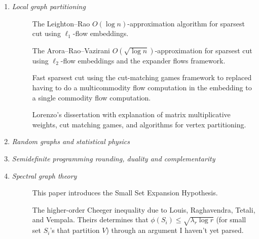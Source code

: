 \documentclass{article}
\theoremstyle{definition}
\begin{document}
\begin{enumerate}[--]

\item \emph{Local graph partitioning}
\begin{description}
\item[\cite{LR99}] The Leighton--Rao $O(\log n)$-approximation algorithm for sparsest cut using $\ell_1$-flow embeddings.

\item[\cite{ARV09}] The Arora--Rao--Vazirani $O(\sqrt{\log n})$-approximation for sparsest cut using $\ell_2$-flow embeddings and the expander flows framework.

\item[\cite{KRV09}] Fast sparsest cut using the cut-matching games framework to replaced having to do a multicommodity flow computation in the embedding to a single commodity flow computation.

\item[\cite{Ore11}] Lorenzo's dissertation with explanation of matrix multiplicative weights, cut matching games, and algorithms for vertex partitioning.
\end{description}


\item \emph{Random graphs and statistical physics}
%


\item \emph{Semidefinite programming rounding, duality and complementarity}
%


\item \emph{Spectral graph theory}
\begin{description}
\item[\cite{RS10}] This paper introduces the Small Set Expansion Hypothesis.

\item[\cite{LRTV12}] The higher-order Cheeger inequality due to Louis, Raghavendra, Tetali, and Vempala. Theirs determines that $\phi(S_i) \leq \sqrt{\lambda_r \log r}$ (for small set $S_i$'s that partition $V$) through an argument I haven't yet parsed.


\end{description}
\end{enumerate}
\end{document}
